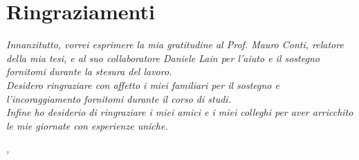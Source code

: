 
\cleardoublepage
{}
{}


\bigskip

\begingroup
\let\clearpage\relax
\let\cleardoublepage\relax
\let\cleardoublepage\relax

\chapter*{Ringraziamenti}

\noindent \textit{Innanzitutto, vorrei esprimere la mia gratitudine al Prof. Mauro Conti, relatore della mia tesi, e al suo collaboratore Daniele Lain per l'aiuto e il sostegno fornitomi durante la stesura del lavoro.}\\

\noindent \textit{Desidero ringraziare con affetto i miei familiari per il sostegno e l'incoraggiamento fornitomi durante il corso di studi.}\\

\noindent \textit{Infine ho desiderio di ringraziare i miei amici e i miei colleghi per aver arricchito le mie giornate con esperienze uniche.}\\
\bigskip

\noindent\textit{\myLocation, \myTime}
\hfill \myName

\endgroup

